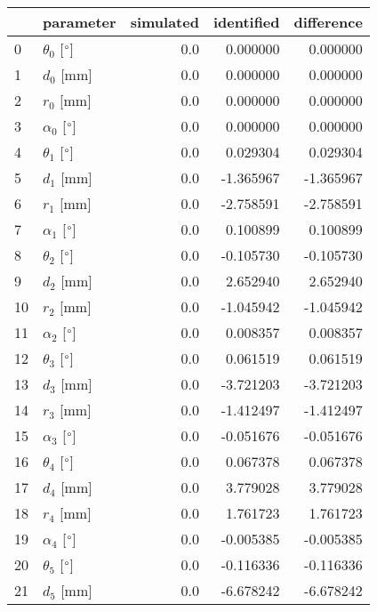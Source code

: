 \documentclass{standalone}%
\begin{document}
%
\normalsize%
\begin{tabular}{llrrr}
\toprule
{} &                 parameter & simulated & identified & difference \\
\midrule
0  &  $\theta_{0}$ [$\degree$] &       0.0 &   0.000000 &   0.000000 \\
1  &              $d_{0}$ [mm] &       0.0 &   0.000000 &   0.000000 \\
2  &              $r_{0}$ [mm] &       0.0 &   0.000000 &   0.000000 \\
3  &  $\alpha_{0}$ [$\degree$] &       0.0 &   0.000000 &   0.000000 \\
4  &  $\theta_{1}$ [$\degree$] &       0.0 &   0.029304 &   0.029304 \\
5  &              $d_{1}$ [mm] &       0.0 &  -1.365967 &  -1.365967 \\
6  &              $r_{1}$ [mm] &       0.0 &  -2.758591 &  -2.758591 \\
7  &  $\alpha_{1}$ [$\degree$] &       0.0 &   0.100899 &   0.100899 \\
8  &  $\theta_{2}$ [$\degree$] &       0.0 &  -0.105730 &  -0.105730 \\
9  &              $d_{2}$ [mm] &       0.0 &   2.652940 &   2.652940 \\
10 &              $r_{2}$ [mm] &       0.0 &  -1.045942 &  -1.045942 \\
11 &  $\alpha_{2}$ [$\degree$] &       0.0 &   0.008357 &   0.008357 \\
12 &  $\theta_{3}$ [$\degree$] &       0.0 &   0.061519 &   0.061519 \\
13 &              $d_{3}$ [mm] &       0.0 &  -3.721203 &  -3.721203 \\
14 &              $r_{3}$ [mm] &       0.0 &  -1.412497 &  -1.412497 \\
15 &  $\alpha_{3}$ [$\degree$] &       0.0 &  -0.051676 &  -0.051676 \\
16 &  $\theta_{4}$ [$\degree$] &       0.0 &   0.067378 &   0.067378 \\
17 &              $d_{4}$ [mm] &       0.0 &   3.779028 &   3.779028 \\
18 &              $r_{4}$ [mm] &       0.0 &   1.761723 &   1.761723 \\
19 &  $\alpha_{4}$ [$\degree$] &       0.0 &  -0.005385 &  -0.005385 \\
20 &  $\theta_{5}$ [$\degree$] &       0.0 &  -0.116336 &  -0.116336 \\
21 &              $d_{5}$ [mm] &       0.0 &  -6.678242 &  -6.678242 \\

\end{tabular}
\end{document}
